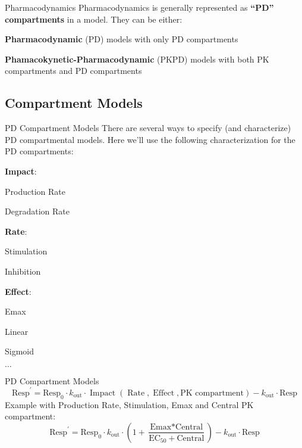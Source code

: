 \begin{frame}{Pharmacodynamics}
    Pharmacodynamics is generally represented as \textbf{``PD'' compartments} in a model.
    \vfill
    They can be either:
    \begin{vfilleditems}
        \item \textbf{Pharmacodynamic} (PD) models with only PD compartments
        \item \textbf{Phamacokynetic-Pharmacodynamic} (PKPD) models with both PK compartments and PD compartments
    \end{vfilleditems}
\end{frame}

\subsection{Compartment Models}
\begin{frame}{PD Compartment Models}
    There are several ways to specify (and characterize) PD compartmental models.
    \vfill
    Here we'll use the following characterization for the PD compartments:
    \begin{vfilleditems}
        \item \textbf{Impact}:
        \begin{vfilleditems}
            \item Production Rate
            \item Degradation Rate
        \end{vfilleditems}
        \item \textbf{Rate}:
        \begin{vfilleditems}
            \item Stimulation
            \item Inhibition
        \end{vfilleditems}
        \item \textbf{Effect}:
        \begin{vfilleditems}
            \item Emax
            \item Linear
            \item Sigmoid
            \item $\ldots$
        \end{vfilleditems}
    \end{vfilleditems}
\end{frame}

\begin{frame}{PD Compartment Models}
    $$
        \text{Resp}^{\prime} = \text{Resp}_0 \cdot k_{\text{out}} \cdot \operatorname{Impact}(\operatorname{Rate}, \operatorname{Effect}, \text{PK compartment}) - k_{\text{out}} \cdot \text{Resp}
    $$
    \vfill
    Example with Production Rate, Stimulation, Emax and Central PK compartment:
    $$
        \text{Resp}^{\prime} = \text{Resp}_0 \cdot k_{\text{out}} \cdot \left(1 + \frac{\text{Emax} * \text{Central}}{\text{EC}_{50} + \text{Central}} \right) - k_{\text{out}} \cdot \text{Resp}
    $$
\end{frame}

